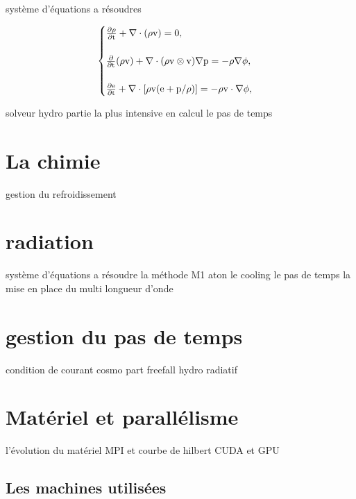 système d'équations a résoudres

\begin{equation}
\begin{cases}

\rm{ \frac{ \partial \rho }{ \partial t } + \nabla \cdot (\rho v) = 0}, \\
\\
\rm{ \frac{ \partial }{ \partial t } (\rho v) + \nabla \cdot (\rho v \otimes v ) \nabla p = -\rho\nabla \phi }, \\
\\
\rm{ \frac{ \partial e }{ \partial t } + \nabla \cdot [ \rho v (e+p/\rho) ] = -\rho v \cdot \nabla \phi },

\end{cases}
\end{equation}
\label{eq:hydro}



solveur hydro
partie la plus intensive en calcul
le pas de temps

\section{La chimie}

gestion du refroidissement

\section{radiation}

système d'équations a résoudre
la méthode M1
aton
le cooling
le pas de temps
la mise en place du multi longueur d'onde

\section{gestion du pas de temps}

condition de courant
cosmo
part
freefall
hydro
radiatif

\section{Matériel et parallélisme}

l'évolution du matériel
MPI et courbe de hilbert
CUDA et GPU

\subsection{Les machines utilisées}

